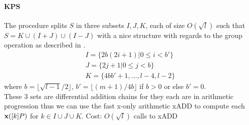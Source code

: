\documentclass[../main.tex]{subfilesubs}
\begin{document}
\paragraph{KPS} The procedure  splits $S$ in three subsets $I,J,K$, each of size $O(\sqrt{l})$ such that $S = K\cup(I+J)\cup(I-J)$ with a nice structure with regards to the group operation as described in \cite{}.
\[\begin{array}{l}I = \{2b(2i+1)|0\leq i<b'\} \\
J = \{2j+1|0\leq j<b\} \\
K=\{4bb'+1, \ldots, l-4, l-2\}\end{array}\]
where $b=\lfloor \sqrt{l-1}/2\rfloor,\, b'=\lfloor (m+1)/4b \rfloor$ if $b>0$ or else $b'=0$.\\
These 3 sets are differential addition chains for they each are in arithmetic progression thus we can use the fast x-only arithmetic xADD to compute each $\textbf{x}([k]P)$ for $k\in I\cup J\cup K$.
Cost: $O(\sqrt{l})$ calls to xADD
\end{document}
